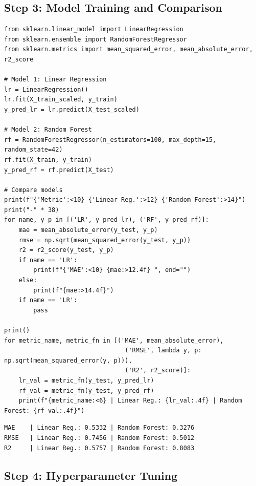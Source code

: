 \subsection{Step 3: Model Training and Comparison}

\begin{codeblock}[title=\textbf{Python}]
\begin{verbatim}
from sklearn.linear_model import LinearRegression
from sklearn.ensemble import RandomForestRegressor
from sklearn.metrics import mean_squared_error, mean_absolute_error, r2_score

# Model 1: Linear Regression
lr = LinearRegression()
lr.fit(X_train_scaled, y_train)
y_pred_lr = lr.predict(X_test_scaled)

# Model 2: Random Forest
rf = RandomForestRegressor(n_estimators=100, max_depth=15, random_state=42)
rf.fit(X_train, y_train)
y_pred_rf = rf.predict(X_test)

# Compare models
print(f"{'Metric':<10} {'Linear Reg.':>12} {'Random Forest':>14}")
print("-" * 38)
for name, y_p in [('LR', y_pred_lr), ('RF', y_pred_rf)]:
    mae = mean_absolute_error(y_test, y_p)
    rmse = np.sqrt(mean_squared_error(y_test, y_p))
    r2 = r2_score(y_test, y_p)
    if name == 'LR':
        print(f"{'MAE':<10} {mae:>12.4f} ", end="")
    else:
        print(f"{mae:>14.4f}")
    if name == 'LR':
        pass

print()
for metric_name, metric_fn in [('MAE', mean_absolute_error),
                                 ('RMSE', lambda y, p: np.sqrt(mean_squared_error(y, p))),
                                 ('R2', r2_score)]:
    lr_val = metric_fn(y_test, y_pred_lr)
    rf_val = metric_fn(y_test, y_pred_rf)
    print(f"{metric_name:<6} | Linear Reg.: {lr_val:.4f} | Random Forest: {rf_val:.4f}")
\end{verbatim}
\end{codeblock}

\begin{codeoutput}
\begin{verbatim}
MAE    | Linear Reg.: 0.5332 | Random Forest: 0.3276
RMSE   | Linear Reg.: 0.7456 | Random Forest: 0.5012
R2     | Linear Reg.: 0.5757 | Random Forest: 0.8083
\end{verbatim}
\end{codeoutput}

\subsection{Step 4: Hyperparameter Tuning}

